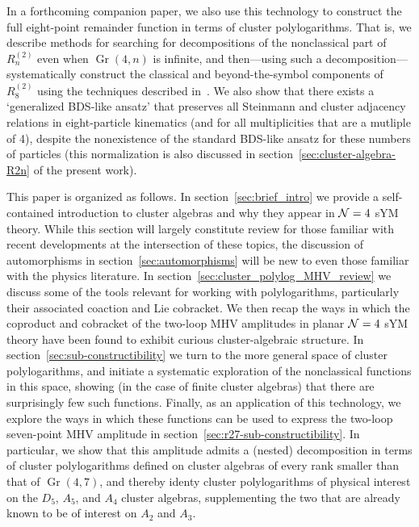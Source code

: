 \documentclass[12pt]{article}
\DeclareMathOperator{\Gr}{Gr}
\begin{document}
In a forthcoming companion paper, we also use this technology to construct the full eight-point remainder function in terms of cluster polylogarithms. That is, we describe methods for searching for decompositions of the nonclassical part of $R_n^{(2)}$ even when $\Gr(4,n)$ is infinite, and then---using such a decomposition---systematically construct the classical and beyond-the-symbol components of $R_8^{(2)}$ using the techniques described in~\cite{Golden:2014xqf}. We also show that there exists a `generalized BDS-like ansatz' that preserves all Steinmann and cluster adjacency relations in eight-particle kinematics (and for all multiplicities that are a mutliple of 4), despite the nonexistence of the standard BDS-like ansatz for these numbers of particles (this normalization is also discussed in section~\ref{sec:cluster-algebra-R2n} of the present work).

This paper is organized as follows. In section~\ref{sec:brief_intro} we provide a self-contained introduction to cluster algebras and why they appear in ${\cal N} =4$ sYM theory. While this section will largely constitute review for those familiar with recent developments at the intersection of these topics, the discussion of automorphisms in section~\ref{sec:automorphisms} will be new to even those familiar with the physics literature. In section~\ref{sec:cluster_polylog_MHV_review} we discuss some of the tools relevant for working with polylogarithms, particularly their associated coaction and Lie cobracket. We then recap the ways in which the coproduct and cobracket of the two-loop MHV amplitudes in planar ${\cal N} =4$ sYM theory have been found to exhibit curious cluster-algebraic structure. In section~\ref{sec:sub-constructibility} we turn to the more general space of cluster polylogarithms, and initiate a systematic exploration of the nonclassical functions in this space, showing (in the case of finite cluster algebras) that there are surprisingly few such functions. Finally, as an application of this technology, we explore the ways in which these functions can be used to express the two-loop seven-point MHV amplitude in section~\ref{sec:r27-sub-constructibility}. In particular, we show that this amplitude admits a (nested) decomposition in terms of cluster polylogarithms defined on cluster algebras of every rank smaller than that of $\Gr(4,7)$, and thereby identy cluster polylogarithms of physical interest on the $D_5$, $A_5$, and $A_4$ cluster algebras, supplementing the two that are already known to be of interest on $A_2$ and $A_3$. 
\end{document}
